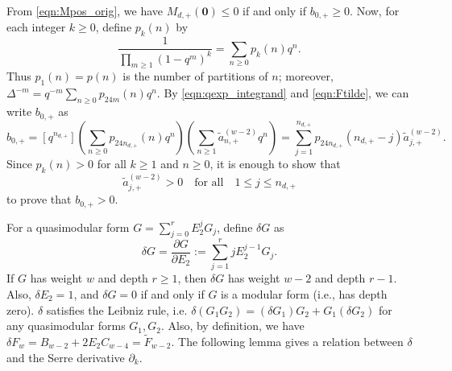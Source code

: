 \documentclass[10pt,reqno]{amsproc}
\newcommand{\1}{\mathds{1}}	%
\theoremstyle{definition}
\theoremstyle{remark}
\begin{document}
From \eqref{eqn:Mpos_orig}, we have $M_{d,+}(\mathbf{0}) \leq 0$ if and only if $b_{0,+} \geq 0$.
Now, for each integer $k \ge 0$, define $p_k(n)$ by
\begin{equation}
    \label{eqn:pkn}
    \frac{1}{\prod_{m \ge 1} (1 - q^m)^k} = \sum_{n \ge 0} p_k(n) q^n.
\end{equation}
Thus $p_1(n) = p(n)$ is the number of partitions of $n$; moreover, $\Delta^{-m} = q^{-m} \sum_{n \geq 0} p_{24m}(n) q^n$.
By \eqref{eqn:qexp_integrand} and \eqref{eqn:Ftilde}, we can write $b_{0,+}$ as
\begin{equation}
    \label{eqn:bzero_pos}
    b_{0,+} = [q^{n_{d,+}}] \left(\sum_{n \geq 0} p_{24 n_{d,+}}(n) q^n\right) \left(\sum_{n \geq 1} \tilde{a}_{n,+}^{(w-2)} q^n \right) = \sum_{j=1}^{n_{d,+}} p_{24 n_{d,+}}(n_{d,+} - j) \tilde{a}_{j,+}^{(w-2)}.
\end{equation}
Since $p_k(n) > 0$ for all $k \geq 1$ and $n \geq 0$, it is enough to show that
\begin{equation}
    \tilde{a}_{j,+}^{(w-2)} > 0 \quad \text{for all}\quad 1 \le j \le n_{d,+}
\end{equation}
to prove that $b_{0,+}>0$.

For a quasimodular form $G = \sum_{j=0}^{r} E_2^j G_{j}$, define $\delta G$ as
\begin{equation}
    \label{eqn:delta}
    \delta G = \frac{\partial G}{\partial E_2} := \sum_{j=1}^{r} j E_2^{j-1} G_j.
\end{equation}
If $G$ has weight $w$ and depth $r \geq 1$, then $\delta G$ has weight $w - 2$ and depth $r - 1$.
Also, $\delta E_2 = 1$, and $\delta G = 0$ if and only if $G$ is a modular form (i.e., has depth zero).
$\delta$ satisfies the Leibniz rule, i.e. $\delta(G_1 G_2) = (\delta G_1) G_2 + G_1 (\delta G_2)$ for any quasimodular forms $G_1, G_2$.
Also, by definition, we have $\delta F_w = B_{w-2} + 2 E_2 C_{w-4} = \widetilde{F}_{w-2}$.
The following lemma gives a relation between $\delta$ and the Serre derivative $\partial_k$.
\end{document}
